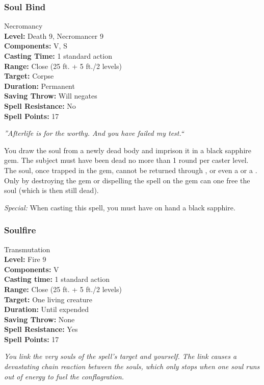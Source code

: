 \subsubsection{Soul Bind}
\label{Spell:SoulBind}
Necromancy
\\ \textbf{Level:} Death 9, Necromancer 9
\\ \textbf{Components:} V, S
\\ \textbf{Casting Time:} 1 standard action
\\ \textbf{Range:} Close (25 ft. + 5 ft./2 levels)
\\ \textbf{Target:} Corpse
\\ \textbf{Duration:} Permanent
\\ \textbf{Saving Throw:} Will negates
\\ \textbf{Spell Resistance:} No
\\ \textbf{Spell Points:} 17

\emph{''Afterlife is for the worthy. And you have failed my test.``}

You draw the soul from a newly dead body and imprison it in a black sapphire gem. 
The subject must have been dead no more than 1 round per caster level. 
The soul, once trapped in the gem, cannot be returned through ,  or even a  or a . 
Only by destroying the gem or dispelling the spell on the gem can one free the soul (which is then still dead).

 \emph{Special:} When casting this spell, you must have on hand a black sapphire.
\subsubsection{Soulfire}
\label{Spell:Soulfire}
Transmutation
\\ \textbf{Level:} Fire 9
\\ \textbf{Components:} V
\\ \textbf{Casting time:} 1 standard action
\\ \textbf{Range:} Close (25 ft. + 5 ft./2 levels)
\\ \textbf{Target:} One living creature
\\ \textbf{Duration:} Until expended
\\ \textbf{Saving Throw:} None
\\ \textbf{Spell Resistance:} Yes
\\ \textbf{Spell Points:} 17

\emph{You link the very souls of the spell's target and yourself. The link causes a devastating chain reaction between the souls, which only stops when one soul runs out of energy to fuel the conflagration.}

